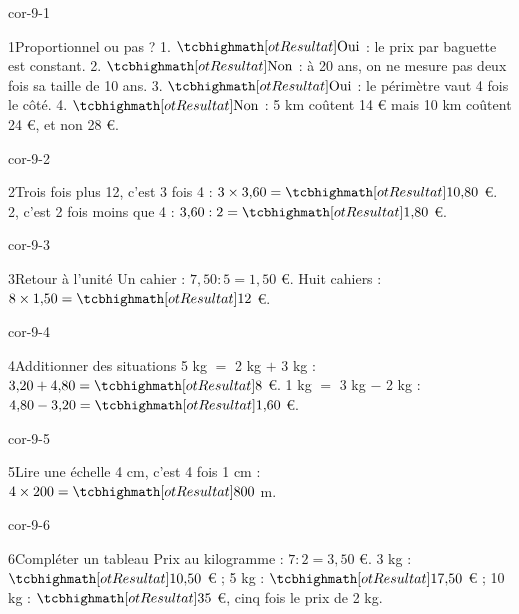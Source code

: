 \clearpage\pagestyle{otMain}\setlength{\otBlocEspacement}{2.5mm}\fontsize{11}{15}\selectfont{}
\begin{blocLivre}{cor-9-1}\begin{corrige}{1}{Proportionnel ou pas ?}
1. $\res{\text{Oui}}$ : le prix par baguette est constant. 2. $\res{\text{Non}}$ : à 20 ans, on ne mesure pas deux fois sa taille de 10 ans. 3. $\res{\text{Oui}}$ : le périmètre vaut 4 fois le côté. 4. $\res{\text{Non}}$ : 5 km coûtent 14 € mais 10 km coûtent 24 €, et non 28 €.
\end{corrige}\end{blocLivre}
\begin{blocLivre}{cor-9-2}\begin{corrige}{2}{Trois fois plus}
12, c’est 3 fois 4 : $3\times3{,}60=\res{10{,}80}$ €. 2, c’est 2 fois moins que 4 : $3{,}60:2=\res{1{,}80}$ €.
\end{corrige}\end{blocLivre}
\begin{blocLivre}{cor-9-3}\begin{corrige}{3}{Retour à l’unité}
Un cahier : $7{,}50:5=1{,}50$ €. Huit cahiers : $8\times1{,}50=\res{12}$ €.
\end{corrige}\end{blocLivre}
\begin{blocLivre}{cor-9-4}\begin{corrige}{4}{Additionner des situations}
5 kg $=$ 2 kg $+$ 3 kg : $3{,}20+4{,}80=\res8$ €. 1 kg $=$ 3 kg $-$ 2 kg : $4{,}80-3{,}20=\res{1{,}60}$ €.
\end{corrige}\end{blocLivre}
\begin{blocLivre}{cor-9-5}\begin{corrige}{5}{Lire une échelle}
4 cm, c’est 4 fois 1 cm : $4\times200=\res{800}$ m.
\label{fig-cor-9-5}
\end{corrige}\end{blocLivre}
\begin{blocLivre}{cor-9-6}\begin{corrige}{6}{Compléter un tableau}
Prix au kilogramme : $7:2=3{,}50$ €. 3 kg : $\res{10{,}50}$ € ; 5 kg : $\res{17{,}50}$ € ; 10 kg : $\res{35}$ €, cinq fois le prix de 2 kg.
\end{corrige}\end{blocLivre}
